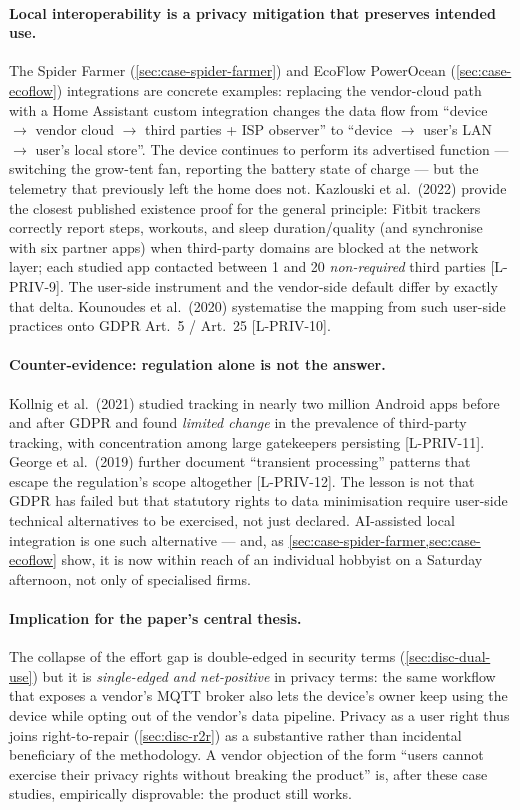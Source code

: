 \documentclass[11pt,a4paper]{article}
\begin{document}
\paragraph{Local interoperability is a privacy mitigation that
preserves intended use.}
The Spider Farmer (\cref{sec:case-spider-farmer}) and EcoFlow PowerOcean
(\cref{sec:case-ecoflow}) integrations are concrete examples: replacing
the vendor-cloud path with a Home Assistant custom integration changes
the data flow from ``device $\to$ vendor cloud $\to$ third parties + ISP
observer'' to ``device $\to$ user's LAN $\to$ user's local store''. The
device continues to perform its advertised function --- switching the
grow-tent fan, reporting the battery state of charge --- but the
telemetry that previously left the home does not. Kazlouski et al.\
(2022) provide the closest published existence proof for the general
principle: Fitbit trackers correctly report steps, workouts, and sleep
duration/quality (and synchronise with six partner apps) when
third-party domains are blocked at the network layer; each studied app
contacted between 1 and 20 \emph{non-required} third parties [L-PRIV-9].
The user-side instrument and the vendor-side default differ by exactly
that delta. Kounoudes et al.\ (2020) systematise the mapping from such
user-side practices onto GDPR Art.\ 5 / Art.\ 25 [L-PRIV-10].

\paragraph{Counter-evidence: regulation alone is not the answer.}
Kollnig et al.\ (2021) studied tracking in nearly two million Android
apps before and after GDPR and found \emph{limited change} in the
prevalence of third-party tracking, with concentration among large
gatekeepers persisting [L-PRIV-11]. George et al.\ (2019) further
document ``transient processing'' patterns that escape the regulation's
scope altogether [L-PRIV-12]. The lesson is not that GDPR has failed
but that statutory rights to data minimisation require user-side
technical alternatives to be exercised, not just declared. AI-assisted
local integration is one such alternative --- and, as
\cref{sec:case-spider-farmer,sec:case-ecoflow} show, it is now within
reach of an individual hobbyist on a Saturday afternoon, not only of
specialised firms.

\paragraph{Implication for the paper's central thesis.}
The collapse of the effort gap is double-edged in security terms
(\cref{sec:disc-dual-use}) but it is \emph{single-edged and net-positive}
in privacy terms: the same workflow that exposes a vendor's MQTT broker
also lets the device's owner keep using the device while opting out of
the vendor's data pipeline. Privacy as a user right thus joins
right-to-repair (\cref{sec:disc-r2r}) as a substantive
rather than incidental beneficiary of the methodology. A vendor
objection of the form ``users cannot exercise their privacy rights
without breaking the product'' is, after these case studies,
empirically disprovable: the product still works.
\end{document}
